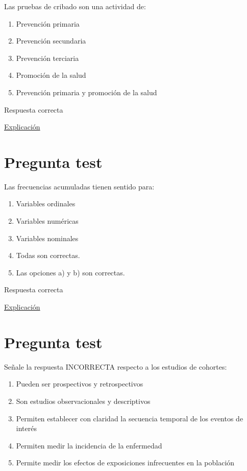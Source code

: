 \documentclass[
]{book}
\providecommand{\tightlist}{%
  \setlength{\itemsep}{0pt}\setlength{\parskip}{0pt}}
\begin{document}
Las pruebas de cribado son una actividad de:

\begin{enumerate}
\def\labelenumi{\alph{enumi})}
\tightlist
\item
  Prevención primaria
\item
  Prevención secundaria
\item
  Prevención terciaria
\item
  Promoción de la salud
\item
  Prevención primaria y promoción de la salud
\end{enumerate}

Respuesta correcta

\href{https://es.wikipedia.org/wiki/Prevención_secundaria}{Explicación}

\hypertarget{pregunta-test-34}{%
\section{Pregunta test}\label{pregunta-test-34}}

Las frecuencias acumuladas tienen sentido para:

\begin{enumerate}
\def\labelenumi{\alph{enumi})}
\tightlist
\item
  Variables ordinales
\item
  Variables numéricas
\item
  Variables nominales
\item
  Todas son correctas.
\item
  Las opciones a) y b) son correctas.
\end{enumerate}

Respuesta correcta

\href{https://1fjmanzano.github.io/bioestadistica/tablas-de-frecuencias.html}{Explicación}

\hypertarget{pregunta-test-35}{%
\section{Pregunta test}\label{pregunta-test-35}}

Señale la respuesta INCORRECTA respecto a los estudios de cohortes:

\begin{enumerate}
\def\labelenumi{\alph{enumi})}
\tightlist
\item
  Pueden ser prospectivos y retrospectivos
\item
  Son estudios observacionales y descriptivos
\item
  Permiten establecer con claridad la secuencia temporal de los eventos de interés
\item
  Permiten medir la incidencia de la enfermedad
\item
  Permite medir los efectos de exposiciones infrecuentes en la población
\end{enumerate}
\end{document}
